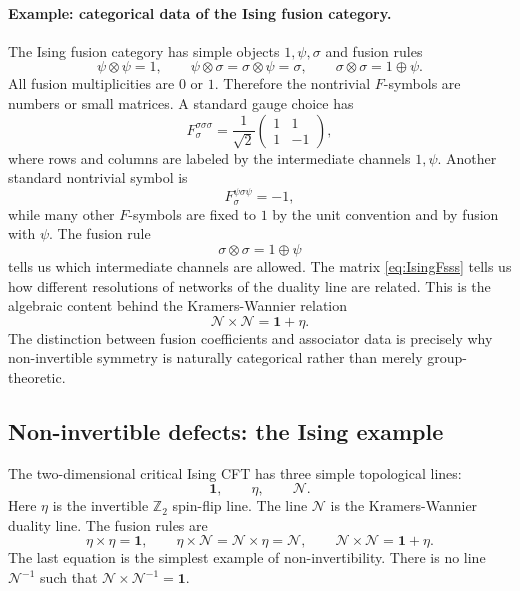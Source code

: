 \documentclass[11pt]{article}
\newcommand{\Z}{\mathbb{Z}}
\newcommand{\cN}{\mathcal{N}}
\newcommand{\id}{\mathbf{1}}
\begin{document}
\paragraph{Example: categorical data of the Ising fusion category.}
The Ising fusion category has simple objects $1,\psi,\sigma$ and fusion rules
\begin{equation}
  \psi\otimes\psi=1,
  \qquad
  \psi\otimes\sigma=\sigma\otimes\psi=\sigma,
  \qquad
  \sigma\otimes\sigma=1\oplus\psi .
\end{equation}
All fusion multiplicities are $0$ or $1$.  Therefore the nontrivial $F$-symbols are numbers or small matrices.  A standard gauge choice has
\begin{equation}
  F^{\sigma\sigma\sigma}_{\sigma}
  =\frac{1}{\sqrt2}
  \begin{pmatrix}
    1&1\\
    1&-1
  \end{pmatrix},
  \label{eq:IsingFsss}
\end{equation}
where rows and columns are labeled by the intermediate channels $1,\psi$.  Another standard nontrivial symbol is
\begin{equation}
  F^{\psi\sigma\psi}_{\sigma}=-1,
\end{equation}
while many other $F$-symbols are fixed to $1$ by the unit convention and by fusion with $\psi$.  The fusion rule
\begin{equation}
  \sigma\otimes\sigma=1\oplus\psi
\end{equation}
tells us which intermediate channels are allowed.  The matrix \eqref{eq:IsingFsss} tells us how different resolutions of networks of the duality line are related.  This is the algebraic content behind the Kramers-Wannier relation
\begin{equation}
  \cN\times\cN=\id+\eta .
\end{equation}
The distinction between fusion coefficients and associator data is precisely why non-invertible symmetry is naturally categorical rather than merely group-theoretic.

\subsection{Non-invertible defects: the Ising example}

The two-dimensional critical Ising CFT has three simple topological lines:
\begin{equation}
  \id,\qquad \eta,\qquad \cN .
\end{equation}
Here $\eta$ is the invertible $\Z_2$ spin-flip line.  The line $\cN$ is the Kramers-Wannier duality line.  The fusion rules are
\begin{equation}
  \eta\times\eta=\id,
  \qquad
  \eta\times\cN=\cN\times\eta=\cN,
  \qquad
  \cN\times\cN=\id+\eta .
  \label{eq:IsingFusion}
\end{equation}
The last equation is the simplest example of non-invertibility.  There is no line $\cN^{-1}$ such that $\cN\times \cN^{-1}=\id$.
\end{document}
